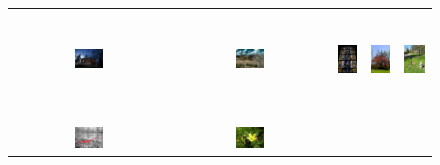 \begin{figure}[th]
{\small{
\begin{center}
\begin{tabular}{@{}c@{\,\,\,}c@{\,\,\,}c@{\,\,\,}c@{\,\,\,}c@{\,\,\,}}
\includegraphics[width=0.19\textwidth]{imggrid/falseposi/1.jpg} &
\includegraphics[width=0.19\textwidth]{imggrid/falseposi/2.jpg} &
\includegraphics[height=1in]{imggrid/falseposi/3.jpg} &
\includegraphics[height=1in]{imggrid/falseposi/4.jpg} &
\includegraphics[height=1in]{imggrid/falseposi/5.jpg} \\
\\[-6pt]
\hline
\\[-6pt]
\includegraphics[width=0.19\textwidth]{imggrid/falseposi/6.jpg} &
\includegraphics[width=0.19\textwidth]{imggrid/falseposi/7.jpg} &

\end{tabular}
\end{center}}}
\end{figure}
